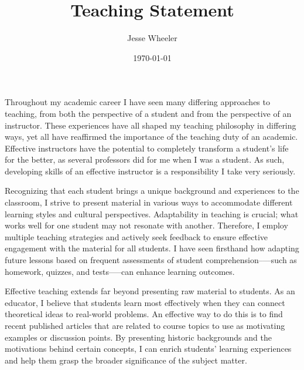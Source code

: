 \documentclass{article}
\title{Teaching Statement}
\author{Jesse Wheeler}
\date{\today}
\begin{document}
\rule{0mm}{1mm}
\vspace{-20mm}


\vspace{1mm}

\rule{0mm}{1mm}

\vspace{3mm}
\rule{0mm}{1mm}

\vspace{4mm}


\noindent Throughout my academic career I have seen many differing approaches to teaching, from both the perspective of a student and from the perspective of an instructor.
These experiences have all shaped my teaching philosophy in differing ways, yet all have reaffirmed the importance of the teaching duty of an academic.
Effective instructors have the potential to completely transform a student's life for the better, as several professors did for me when I was a student.
As such, developing skills of an effective instructor is a responsibility I take very seriously.

Recognizing that each student brings a unique background and experiences to the classroom, I strive to present material in various ways to accommodate different learning styles and cultural perspectives.
Adaptability in teaching is crucial; what works well for one student may not resonate with another.
Therefore, I employ multiple teaching strategies and actively seek feedback to ensure effective engagement with the material for all students.
I have seen firsthand how adapting future lessons based on frequent assessments of student comprehension--—such as homework, quizzes, and tests--—can enhance learning outcomes.

Effective teaching extends far beyond presenting raw material to students.
As an educator, I believe that students learn most effectively when they can connect theoretical ideas to real-world problems.
An effective way to do this is to find recent published articles that are related to course topics to use as motivating examples or discussion points.
By presenting historic backgrounds and the motivations behind certain concepts, I can enrich students' learning experiences and help them grasp the broader significance of the subject matter.
\end{document}
